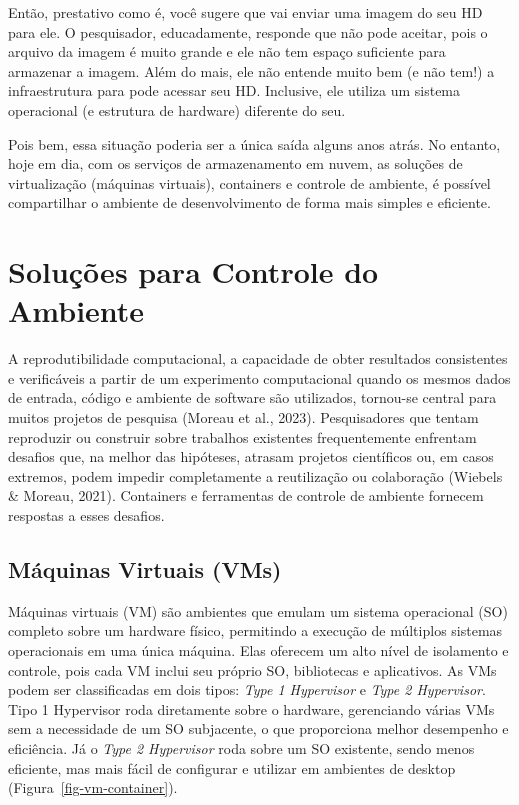 \documentclass[
  a4paper,
]{book}
\begin{document}
Então, prestativo como é, você sugere que vai enviar uma imagem do seu
HD para ele. O pesquisador, educadamente, responde que não pode aceitar,
pois o arquivo da imagem é muito grande e ele não tem espaço suficiente
para armazenar a imagem. Além do mais, ele não entende muito bem (e não
tem!) a infraestrutura para pode acessar seu HD. Inclusive, ele utiliza
um sistema operacional (e estrutura de hardware) diferente do seu.

Pois bem, essa situação poderia ser a única saída alguns anos atrás. No
entanto, hoje em dia, com os serviços de armazenamento em nuvem, as
soluções de virtualização (máquinas virtuais), containers e controle de
ambiente, é possível compartilhar o ambiente de desenvolvimento de forma
mais simples e eficiente.

\section{Soluções para Controle do
Ambiente}\label{soluuxe7uxf5es-para-controle-do-ambiente}

A reprodutibilidade computacional, a capacidade de obter resultados
consistentes e verificáveis a partir de um experimento computacional
quando os mesmos dados de entrada, código e ambiente de software são
utilizados, tornou-se central para muitos projetos de pesquisa (Moreau
et al., 2023). Pesquisadores que tentam reproduzir ou construir sobre
trabalhos existentes frequentemente enfrentam desafios que, na melhor
das hipóteses, atrasam projetos científicos ou, em casos extremos, podem
impedir completamente a reutilização ou colaboração (Wiebels \& Moreau,
2021). Containers e ferramentas de controle de ambiente fornecem
respostas a esses desafios.

\subsection{Máquinas Virtuais (VMs)}\label{muxe1quinas-virtuais-vms}

Máquinas virtuais (VM) são ambientes que emulam um sistema operacional
(SO) completo sobre um hardware físico, permitindo a execução de
múltiplos sistemas operacionais em uma única máquina. Elas oferecem um
alto nível de isolamento e controle, pois cada VM inclui seu próprio SO,
bibliotecas e aplicativos. As VMs podem ser classificadas em dois tipos:
\emph{Type 1 Hypervisor} e \emph{Type 2 Hypervisor}. Tipo 1 Hypervisor
roda diretamente sobre o hardware, gerenciando várias VMs sem a
necessidade de um SO subjacente, o que proporciona melhor desempenho e
eficiência. Já o \emph{Type 2 Hypervisor} roda sobre um SO existente,
sendo menos eficiente, mas mais fácil de configurar e utilizar em
ambientes de desktop (Figura~\ref{fig-vm-container}).
\end{document}
